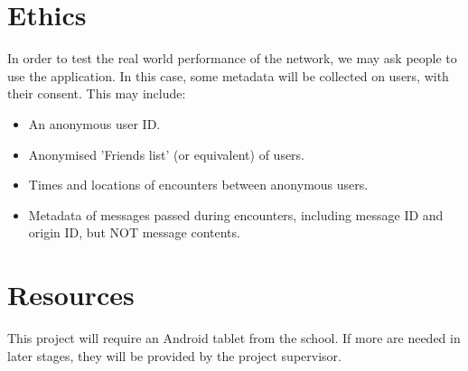 \documentclass{article}
\begin{document}
\section*{Ethics}
In order to test the real world performance of the network, we may ask people to use the application. In this case, some metadata will be collected on users, with their consent. This may include:
\begin{itemize}
\item An anonymous user ID.
\item Anonymised 'Friends list' (or equivalent) of users.
\item Times and locations of encounters between anonymous users.
\item Metadata of messages passed during encounters, including message ID and origin ID, but NOT message contents.
\end{itemize}

\section*{Resources}
This project will require an Android tablet from the school. If more are needed in later stages, they will be provided by the project supervisor.
\end{document}
